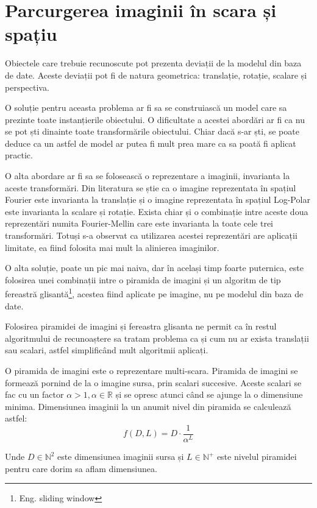 \pagebreak
\section{Parcurgerea imaginii în scara și spațiu}

Obiectele care trebuie recunoscute pot prezenta deviații de la modelul din baza de date.
Aceste deviații pot fi de natura geometrica: translație, rotație, scalare și perspectiva.

O soluție pentru aceasta problema ar fi sa se construiască un model care sa prezinte toate instanțierile obiectului.
O dificultate a acestei abordări ar fi ca nu se pot ști dinainte toate transformările obiectului.
Chiar dacă s-ar ști, se poate deduce ca un astfel de model ar putea fi mult prea mare ca sa poată fi aplicat practic.

O alta abordare ar fi sa se folosească o reprezentare a imaginii, invarianta la aceste transformări.
Din literatura se știe ca o imagine reprezentata în spațiul Fourier este invarianta la translație și o imagine reprezentata în spațiul Log-Polar este invarianta la scalare și rotație\cite{treiber2010introduction}.
Exista chiar și o combinație intre aceste doua reprezentări numita Fourier-Mellin care este invarianta la toate cele trei transformări.
Totuși s-a observat ca utilizarea acestei reprezentări are aplicații limitate, ea fiind folosita mai mult la alinierea imaginilor\cite{treiber2010introduction}.

O alta soluție, poate un pic mai naiva, dar în același timp foarte puternica, este folosirea unei combinații intre o piramida de imagini și un algoritm de tip fereastră glisantă\footnote{Eng. sliding window}, acestea fiind aplicate pe imagine, nu pe modelul din baza de date.

Folosirea piramidei de imagini și fereastra glisanta ne permit ca în restul algoritmului de recunoaștere sa tratam problema ca și cum nu ar exista translații sau scalari, astfel simplificând mult algoritmii aplicați.

O piramida de imagini este o reprezentare multi-scara.
Piramida de imagini se formează pornind de la o imagine sursa, prin scalari succesive.
Aceste scalari se fac cu un factor ${\alpha > 1, \alpha \in \mathbb{R}}$ și se opresc atunci când se ajunge la o dimensiune minima.
Dimensiunea imaginii la un anumit nivel din piramida se calculează astfel:
$${
f(D,L) = D \cdot \frac{1}{\alpha^L}
}$$

Unde ${D \in \mathbb{N}^2}$ este dimensiunea imaginii sursa și ${L \in \mathbb{N}^+}$ este nivelul piramidei pentru care dorim sa aflam dimensiunea.

